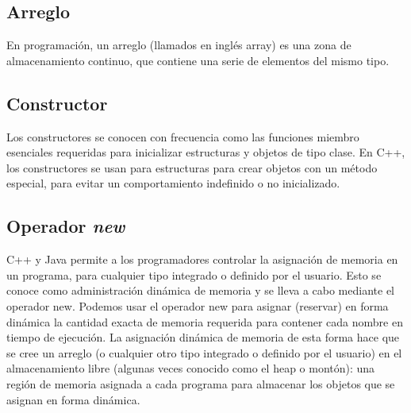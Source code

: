 \subsection{Arreglo}

En programación, un arreglo (llamados en inglés array) es una zona de almacenamiento continuo, que contiene una serie de elementos del mismo tipo.

\subsection{Constructor}
Los constructores se conocen con frecuencia como las funciones miembro esenciales requeridas para inicializar estructuras y objetos de tipo clase. En C++, los constructores se usan para estructuras para crear objetos con un método especial, para evitar un comportamiento indefinido o no inicializado.

\subsection{Operador \emph{new}}
C++ y Java permite a los programadores controlar la asignación de memoria en un programa,
para cualquier tipo integrado o definido por el usuario. Esto se conoce como administración dinámica de memoria y se lleva a cabo mediante el operador new. Podemos usar el operador new
para asignar (reservar) en forma dinámica la cantidad exacta de memoria requerida para contener
cada nombre en tiempo de ejecución. La asignación dinámica de memoria de esta forma hace que
se cree un arreglo (o cualquier otro tipo integrado o definido por el usuario) en el almacenamiento
libre (algunas veces conocido como el heap o montón): una región de memoria asignada a cada
programa para almacenar los objetos que se asignan en forma dinámica.